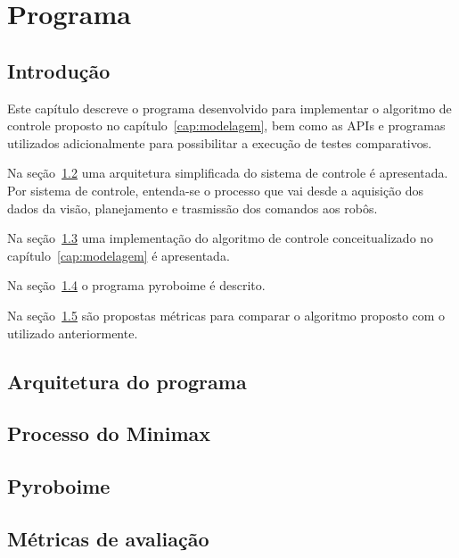 \chapter{Programa}\label{cap:programa}

\section{Introdução}

Este capítulo descreve o programa desenvolvido para implementar o algoritmo de
controle proposto no capítulo~\ref{cap:modelagem}, bem como as APIs e programas
utilizados adicionalmente para possibilitar a execução de testes comparativos.

Na seção~\ref{sec:arq_prog} uma arquitetura simplificada do sistema de controle é apresentada.
Por sistema de controle, entenda-se o processo que vai desde a aquisição dos
dados da visão, planejamento e trasmissão dos comandos aos robôs.

Na seção~\ref{sec:minimax} uma implementação do algoritmo de controle conceitualizado no
capítulo~\ref{cap:modelagem} é apresentada.

Na seção~\ref{sec:pyroboime} o programa pyroboime é descrito.

Na seção~\ref{sec:metricas} são propostas métricas para comparar o algoritmo
proposto com o utilizado anteriormente.

\section{Arquitetura do programa}\label{sec:arq_prog}
\section{Processo do Minimax}\label{sec:minimax}
\section{Pyroboime}\label{sec:pyroboime}
\section{Métricas de avaliação}\label{sec:metricas}
